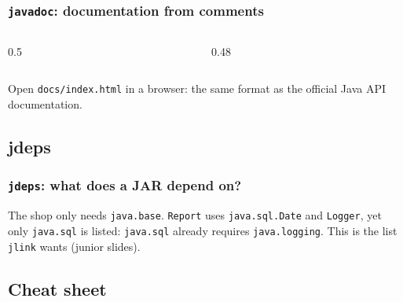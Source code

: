 \documentclass[aspectratio=169,10pt,compress]{beamer}
\begin{document}
\begin{frame}[t,fragile] \frametitle{\texttt{javadoc}: documentation from comments}
  \begin{columns}[T]
    \begin{column}{0.5\textwidth}
    \end{column}
    \begin{column}{0.48\textwidth}
    \end{column}
  \end{columns}

  \vspace{0.1em}
  \small Open \texttt{docs/index.html} in a browser: the same format as the official Java API documentation.
\end{frame}

\subsection[jdeps]{jdeps}




\begin{frame}[t,fragile] \frametitle{\texttt{jdeps}: what does a JAR depend on?}

  \vspace{0.1em}
  \small
  The shop only needs \texttt{java.base}. \texttt{Report} uses \texttt{java.sql.Date} and \texttt{Logger}, yet only \texttt{java.sql}
  is listed: \texttt{java.sql} already requires \texttt{java.logging}. This is the list \texttt{jlink} wants (junior slides).
\end{frame}


\subsection[Cheat sheet]{Cheat sheet}
\end{document}
